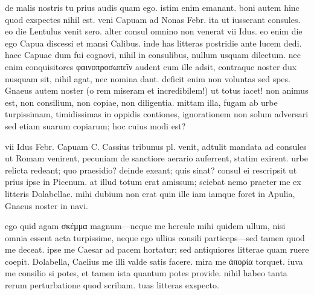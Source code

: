 


 de malis nostris tu prius audis quam ego. istim enim emanant. boni autem hinc quod exspectes nihil est. veni Capuam ad Nonas Febr. ita ut iusserant consules. eo die Lentulus venit sero. alter consul omnino non venerat vii Idus. eo enim die ego Capua discessi et mansi Calibus. inde has litteras postridie ante lucem dedi. haec Capuae dum fui cognovi, nihil in consulibus, nullum usquam dilectum. nec enim conquisitores φαινοπροσωπεῖν audent cum ille adsit, contraque noster dux nusquam sit, nihil agat, nec nomina dant. deficit enim non voluntas sed spes. Gnaeus autem noster (o rem miseram et incredibilem!) ut totus iacet! non animus est, non consilium, non copiae, non diligentia. mittam illa, fugam ab urbe turpissimam, timidissimas in oppidis contiones, ignorationem non solum adversari sed etiam suarum copiarum; hoc cuius modi est?

 vii Idus Febr. Capuam C. Cassius tribunus pl. venit, adtulit mandata ad consules ut Romam venirent, pecuniam de sanctiore aerario auferrent, statim exirent. urbe relicta redeant; quo praesidio? deinde exeant; quis sinat? consul ei rescripsit ut prius ipse in Picenum. at illud totum erat amissum; sciebat nemo praeter me ex litteris Dolabellae. mihi dubium non erat quin ille iam iamque foret in Apulia, Gnaeus noster in navi.

 ego quid agam σκέμμα magnum—neque me hercule mihi quidem ullum, nisi omnia essent acta turpissime, neque ego ullius consili particeps—sed tamen quod me deceat. ipse me Caesar ad pacem hortatur; sed antiquiores litterae quam ruere coepit. Dolabella, Caelius me illi valde satis facere. mira me ἀπορία torquet. iuva me consilio si potes, et tamen ista quantum potes provide. nihil habeo tanta rerum perturbatione quod scribam. tuas litteras exspecto.
